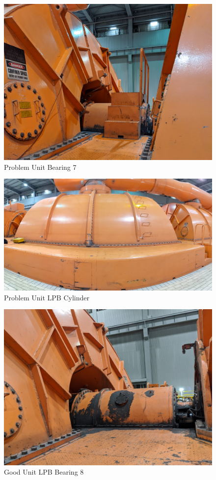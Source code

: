 \documentclass{UoNMCHA}
\numberwithin{equation}{section}
\begin{document}
    \begin{figure}[H]
        \centering
        \includegraphics[keepaspectratio, width = \textwidth]{Figures/U5_LPB_7.png}
        \caption{Problem Unit Bearing 7}
    \end{figure}
    \begin{figure}[H]
        \centering
        \includegraphics[keepaspectratio, width = \textwidth]{Figures/U5_LPB_Centre.png}
        \caption{Problem Unit LPB Cylinder}
    \end{figure}
    \begin{figure}[H]
        \centering
        \includegraphics[keepaspectratio, width = \textwidth]{Figures/U6_LPB_8.png}
        \caption{Good Unit LPB Bearing 8}
    \end{figure}
\end{document}
